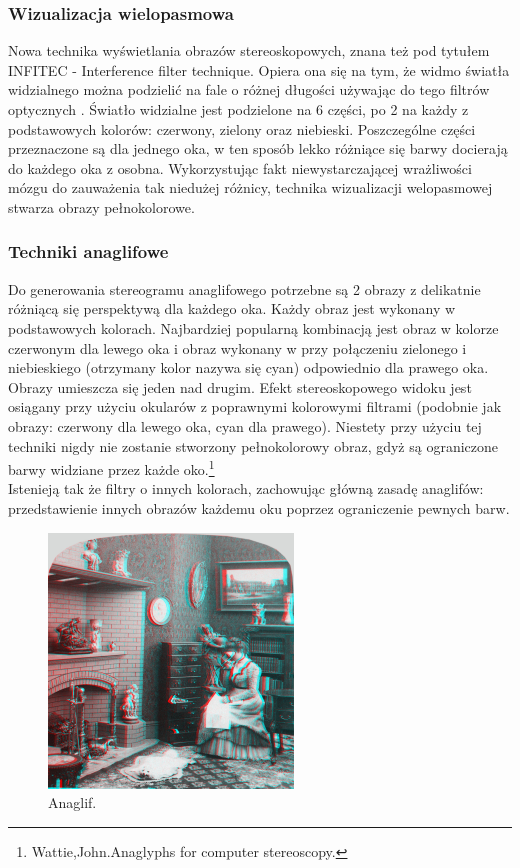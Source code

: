 \subsubsection{Wizualizacja wielopasmowa}
Nowa technika wyświetlania obrazów stereoskopowych, znana też pod tytułem INFITEC - Interference filter technique. Opiera ona się na tym, że widmo światła widzialnego można podzielić na fale o różnej długości używając do tego filtrów optycznych \cite{infitec}.
 Światło widzialne jest podzielone na 6 części, po 2 na każdy z podstawowych kolorów: czerwony, zielony oraz niebieski. Poszczególne części przeznaczone są dla jednego oka, w ten sposób lekko różniące się barwy docierają do każdego oka z osobna. Wykorzystując fakt niewystarczającej wrażliwości mózgu do zauważenia tak niedużej różnicy, technika wizualizacji welopasmowej stwarza obrazy pełnokolorowe.  

\subsubsection{Techniki anaglifowe}
Do generowania stereogramu anaglifowego potrzebne są 2 obrazy z delikatnie różniącą się perspektywą dla każdego oka. Każdy obraz jest wykonany w podstawowych kolorach. Najbardziej popularną kombinacją jest obraz w kolorze czerwonym dla lewego oka i obraz wykonany w przy połączeniu zielonego i niebieskiego (otrzymany kolor nazywa się cyan) odpowiednio dla prawego oka. Obrazy umieszcza się jeden nad drugim. Efekt stereoskopowego widoku jest osiągany przy użyciu okularów z poprawnymi kolorowymi filtrami (podobnie jak obrazy: czerwony dla lewego oka, cyan dla prawego). Niestety przy użyciu tej techniki nigdy nie zostanie stworzony pełnokolorowy obraz, gdyż są ograniczone barwy widziane przez każde oko.\footnote{Wattie,John.Anaglyphs for computer stereoscopy.} \\
Istenieją tak że filtry o innych kolorach, zachowując główną zasadę anaglifów: przedstawienie innych obrazów każdemu oku poprzez ograniczenie pewnych barw. \\

\begin{figure}[H]
		\centering
 		\includegraphics[width=6.5cm]{anaglif.jpg}
    	\caption{Anaglif.}
 		\label{rys4}
\end{figure}

